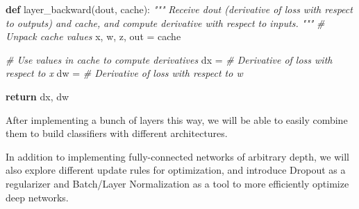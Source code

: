 \documentclass[11pt]{article}
\newenvironment{Shaded}{}{}
\newcommand{\KeywordTok}[1]{\textcolor[rgb]{0.00,0.44,0.13}{\textbf{{#1}}}}
\newcommand{\CommentTok}[1]{\textcolor[rgb]{0.38,0.63,0.69}{\textit{{#1}}}}
\newcommand{\NormalTok}[1]{{#1}}
\newcommand{\ControlFlowTok}[1]{\textcolor[rgb]{0.00,0.44,0.13}{\textbf{{#1}}}}
\newcommand{\OperatorTok}[1]{\textcolor[rgb]{0.40,0.40,0.40}{{#1}}}
\begin{document}
\begin{Shaded}
\begin{Highlighting}[]
\KeywordTok{def}\NormalTok{ layer\_backward(dout, cache):}
  \CommentTok{"""}
\CommentTok{  Receive dout (derivative of loss with respect to outputs) and cache,}
\CommentTok{  and compute derivative with respect to inputs.}
\CommentTok{  """}
  \CommentTok{\# Unpack cache values}
\NormalTok{  x, w, z, out }\OperatorTok{=}\NormalTok{ cache}
  
  \CommentTok{\# Use values in cache to compute derivatives}
\NormalTok{  dx }\OperatorTok{=} \CommentTok{\# Derivative of loss with respect to x}
\NormalTok{  dw }\OperatorTok{=} \CommentTok{\# Derivative of loss with respect to w}
  
  \ControlFlowTok{return}\NormalTok{ dx, dw}
\end{Highlighting}
\end{Shaded}

After implementing a bunch of layers this way, we will be able to easily
combine them to build classifiers with different architectures.

In addition to implementing fully-connected networks of arbitrary depth,
we will also explore different update rules for optimization, and
introduce Dropout as a regularizer and Batch/Layer Normalization as a
tool to more efficiently optimize deep networks.
\end{document}
